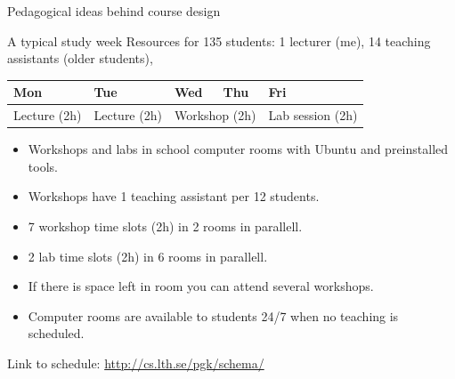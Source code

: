 \documentclass[aspectratio=169]{beamer}
\newenvironment{Slide}[1]%
  {\begin{frame}[environment=Slide]{#1}}
  {\end{frame}}%
\begin{document}
\begin{Slide}{Pedagogical ideas behind course design}
  \end{Slide}

\begin{Slide}{A typical study week}
  Resources for 135 students: 1 lecturer (me), 14 teaching assistants (older students), 
\begin{table}\centering
  \begin{tabular}{l | l |l l | l}
  Mon & Tue & Wed & Thu & Fri \\ \hline
  Lecture (2h) & Lecture (2h) & \multicolumn{2}{c|}{Workshop (2h)} & Lab session (2h) \\ \hline
  \end{tabular}
\end{table}
  \begin{itemize}
    \item Workshops and labs in school computer rooms with Ubuntu and preinstalled tools. 
    \item Workshops have 1 teaching assistant per 12 students. 
    \item 7 workshop time slots (2h) in 2 rooms in parallell.
    \item 2 lab time slots (2h) in 6 rooms in parallell.
    \item If there is space left in room you can attend several workshops.
    \item Computer rooms are available to students 24/7 when no teaching is scheduled.
  \end{itemize}

\vfill Link to schedule: \url{http://cs.lth.se/pgk/schema/}
\end{Slide}  
\end{document}
